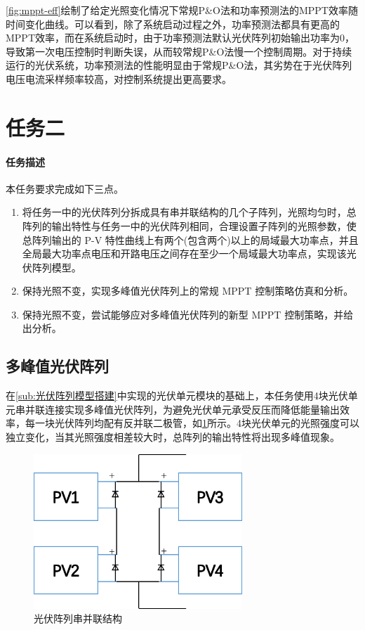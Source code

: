 \documentclass[a4paper,12pt]{article}
\begin{document}
    \cref{fig:mppt-eff}绘制了给定光照变化情况下常规P\&O法和功率预测法的MPPT效率随时间变化曲线。可以看到，除了系统启动过程之外，功率预测法都具有更高的MPPT效率，而在系统启动时，由于功率预测法默认光伏阵列初始输出功率为0，导致第一次电压控制时判断失误，从而较常规P\&O法慢一个控制周期。对于持续运行的光伏系统，功率预测法的性能明显由于常规P\&O法，其劣势在于光伏阵列电压电流采样频率较高，对控制系统提出更高要求。

    \section{任务二} %
    \label{sec:任务二}
    \paragraph{任务描述} %
    本任务要求完成如下三点。
    \begin{enumerate}[noitemsep,topsep=0pt]
    \item 将任务一中的光伏阵列分拆成具有串并联结构的几个子阵列，光照均匀时，总阵列的输出特性与任务一中的光伏阵列相同，合理设置子阵列的光照参数，使总阵列输出的 P-V 特性曲线上有两个(包含两个)以上的局域最大功率点，并且全局最大功率点电压和开路电压之间存在至少一个局域最大功率点，实现该光伏阵列模型。
    \item 保持光照不变，实现多峰值光伏阵列上的常规 MPPT 控制策略仿真和分析。
    \item 保持光照不变，尝试能够应对多峰值光伏阵列的新型 MPPT 控制策略，并给出分析。
    \end{enumerate}
    \subsection{多峰值光伏阵列} %
    \label{sub:多峰值光伏阵列}
    在\cref{sub:光伏阵列模型搭建}中实现的光伏单元模块的基础上，本任务使用4块光伏单元串并联连接实现多峰值光伏阵列，为避免光伏单元承受反压而降低能量输出效率，每一块光伏阵列均配有反并联二极管，如\cref{fig:pvarray}所示。4块光伏单元的光照强度可以独立变化，当其光照强度相差较大时，总阵列的输出特性将出现多峰值现象。
    \begin{figure}[htbp]
        \centering
        \includegraphics[width=0.7\textwidth]{pvarray.png}
        \caption{光伏阵列串并联结构}
        \label{fig:pvarray}
    \end{figure}
\end{document}
